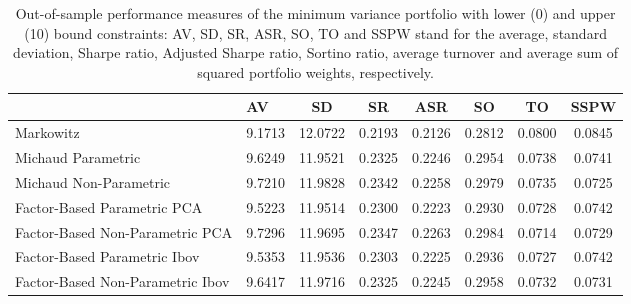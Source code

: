 \begin{table}

\caption{\label{tab:luc_mvp}Out-of-sample performance measures of the minimum variance portfolio with lower (0) and upper (10) bound constraints: AV, SD, SR, ASR, SO, TO and SSPW stand for the average, standard deviation, Sharpe ratio, Adjusted Sharpe ratio, Sortino ratio, average turnover and average sum of squared portfolio weights, respectively.}
\centering
\begin{tabular}[t]{l|l|c|c|c|c|c|c}
\hline
  & AV & SD & SR & ASR & SO & TO & SSPW\\
\hline
Markowitz & 9.1713 & 12.0722 & 0.2193 & 0.2126 & 0.2812 & 0.0800 & 0.0845\\
\hline
Michaud Parametric & 9.6249 & 11.9521 & 0.2325 & 0.2246 & 0.2954 & 0.0738 & 0.0741\\
\hline
Michaud Non-Parametric & 9.7210 & 11.9828 & 0.2342 & 0.2258 & 0.2979 & 0.0735 & 0.0725\\
\hline
Factor-Based Parametric PCA & 9.5223 & 11.9514 & 0.2300 & 0.2223 & 0.2930 & 0.0728 & 0.0742\\
\hline
Factor-Based Non-Parametric PCA & 9.7296 & 11.9695 & 0.2347 & 0.2263 & 0.2984 & 0.0714 & 0.0729\\
\hline
Factor-Based Parametric Ibov & 9.5353 & 11.9536 & 0.2303 & 0.2225 & 0.2936 & 0.0727 & 0.0742\\
\hline
Factor-Based Non-Parametric Ibov & 9.6417 & 11.9716 & 0.2325 & 0.2245 & 0.2958 & 0.0732 & 0.0731\\
\hline
\end{tabular}
\end{table}
